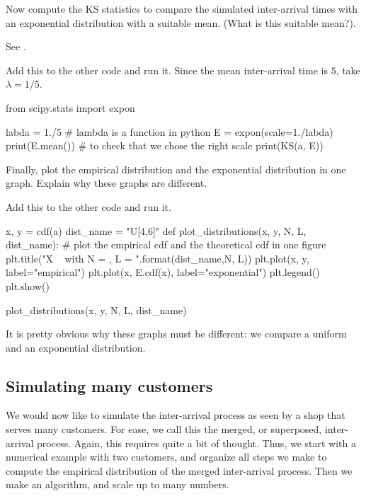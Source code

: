 \begin{exercise}
  Now compute the KS statistics to compare the simulated inter-arrival times with an exponential distribution with a suitable mean. (What is this suitable mean?).

See .


\begin{solution}
Add this to the other code and run it. Since the mean inter-arrival time is $5$, take $\lambda = 1/5$.

\begin{pyverbatim}
from scipy.stats import expon

labda = 1./5 # lambda is a function in python
E = expon(scale=1./labda) 
print(E.mean()) # to check that we chose the right scale
print(KS(a, E))    
\end{pyverbatim}
\end{solution}
\end{exercise}

\begin{exercise}
  Finally, plot the empirical distribution and the exponential distribution in one graph. Explain why these graphs are different.
\begin{solution}
Add this to the other code and run it. 
\begin{pyverbatim}
x, y = cdf(a)
dist_name = "U[4,6]"
def plot_distributions(x, y, N, L, dist_name):
    # plot the empirical cdf and the theoretical cdf in one figure
    plt.title("X ~ {} with N = {}, L = {}".format(dist_name,N, L))
    plt.plot(x, y, label="empirical")
    plt.plot(x, E.cdf(x), label="exponential")
    plt.legend()
    plt.show()

plot_distributions(x, y, N, L, dist_name)	
\end{pyverbatim}

It is pretty obvious why these graphs must be different: we compare a uniform and an exponential distribution. 
\end{solution}
\end{exercise}


\subsection{Simulating many customers}
\label{sec:simul-many-cust}

We would now like to simulate the inter-arrival process as seen by a shop that serves many customers. For ease, we call this the merged, or superposed, inter-arrival process. Again, this requires quite a bit of thought. Thus, we start with a numerical example with two customers, and organize all steps we make to compute the empirical distribution of the merged inter-arrival process. Then we make an algorithm, and scale up to many numbers. 

